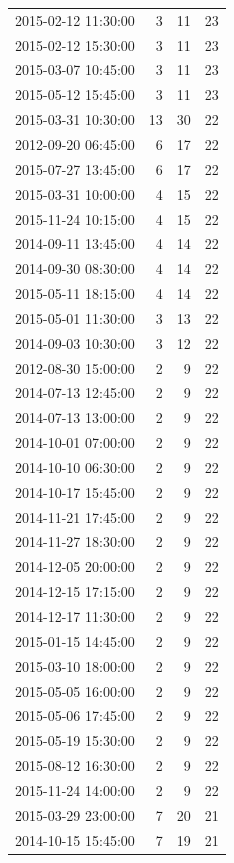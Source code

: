 \begin{tabular}{lrrr}
2015-02-12 11:30:00 & 3 & 11 & 23 \\
2015-02-12 15:30:00 & 3 & 11 & 23 \\
2015-03-07 10:45:00 & 3 & 11 & 23 \\
2015-05-12 15:45:00 & 3 & 11 & 23 \\
2015-03-31 10:30:00 & 13 & 30 & 22 \\
2012-09-20 06:45:00 & 6 & 17 & 22 \\
2015-07-27 13:45:00 & 6 & 17 & 22 \\
2015-03-31 10:00:00 & 4 & 15 & 22 \\
2015-11-24 10:15:00 & 4 & 15 & 22 \\
2014-09-11 13:45:00 & 4 & 14 & 22 \\
2014-09-30 08:30:00 & 4 & 14 & 22 \\
2015-05-11 18:15:00 & 4 & 14 & 22 \\
2015-05-01 11:30:00 & 3 & 13 & 22 \\
2014-09-03 10:30:00 & 3 & 12 & 22 \\
2012-08-30 15:00:00 & 2 & 9 & 22 \\
2014-07-13 12:45:00 & 2 & 9 & 22 \\
2014-07-13 13:00:00 & 2 & 9 & 22 \\
2014-10-01 07:00:00 & 2 & 9 & 22 \\
2014-10-10 06:30:00 & 2 & 9 & 22 \\
2014-10-17 15:45:00 & 2 & 9 & 22 \\
2014-11-21 17:45:00 & 2 & 9 & 22 \\
2014-11-27 18:30:00 & 2 & 9 & 22 \\
2014-12-05 20:00:00 & 2 & 9 & 22 \\
2014-12-15 17:15:00 & 2 & 9 & 22 \\
2014-12-17 11:30:00 & 2 & 9 & 22 \\
2015-01-15 14:45:00 & 2 & 9 & 22 \\
2015-03-10 18:00:00 & 2 & 9 & 22 \\
2015-05-05 16:00:00 & 2 & 9 & 22 \\
2015-05-06 17:45:00 & 2 & 9 & 22 \\
2015-05-19 15:30:00 & 2 & 9 & 22 \\
2015-08-12 16:30:00 & 2 & 9 & 22 \\
2015-11-24 14:00:00 & 2 & 9 & 22 \\
2015-03-29 23:00:00 & 7 & 20 & 21 \\
2014-10-15 15:45:00 & 7 & 19 & 21 \\

\end{tabular}
